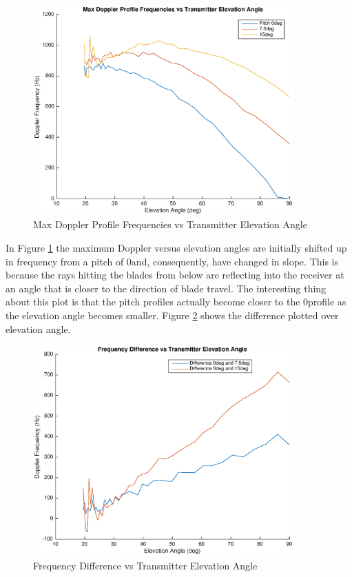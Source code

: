\begin{figure}
	\begin{center}
		\includegraphics[width=10cm]{images/simulation/elevation_angle_with_pitch_max_doppler.eps}
		\caption{Max Doppler Profile Frequencies vs Transmitter Elevation Angle}
		\label{fig:pitch_tx_elevation_angle}
	\end{center}
\end{figure}

In Figure \ref{fig:pitch_tx_elevation_angle} the maximum Doppler versus elevation angles are initially shifted up in frequency from a pitch of 0\textdegree \space and, consequently, have changed in slope. This is because the rays hitting the blades from below are reflecting into the receiver at an angle that is closer to the direction of blade travel. The interesting thing about this plot is that the pitch profiles actually become closer to the 0\textdegree \space profile as the elevation angle becomes smaller. Figure \ref{fig:pitch_tx_elevation_angle_difference} shows the difference plotted over elevation angle.

\begin{figure}
	\begin{center}
		\includegraphics[width=10cm]{images/simulation/elevation_angle_with_pitch_max_doppler_Difference.eps}
		\caption{Frequency Difference vs Transmitter Elevation Angle}
		\label{fig:pitch_tx_elevation_angle_difference}
	\end{center}
\end{figure}

